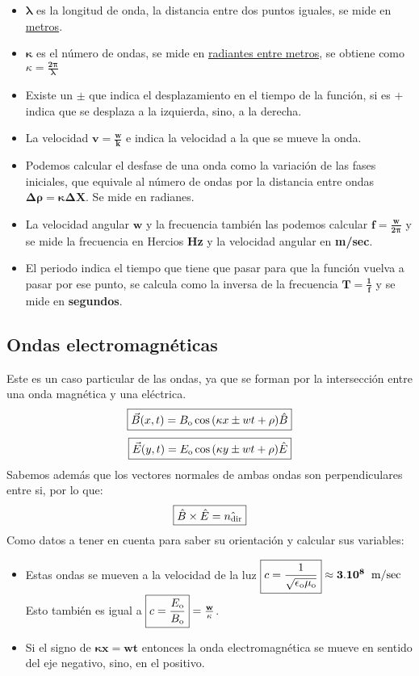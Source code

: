 \begin{itemize}
        \item \(\mathbf{\lambda}\) es la longitud de onda, la distancia entre dos puntos iguales, se mide en \underline{metros}.
        \item \(\mathbf{\kappa}\) es el número de ondas, se mide en \underline{radiantes entre metros}, se obtiene como \(\boxed{\kappa=\mathbf{\frac{2\pi}{\lambda}}}\)
        \item Existe un \(\mathbf{\pm}\) que indica el desplazamiento en el tiempo de la función, si es \(\mathbf{+}\) indica que se desplaza a la izquierda, sino, a la derecha.
        \item La velocidad \(\boxed{\mathbf{v = \frac{w}{k}}}\) e indica la velocidad a la que se mueve la onda.
        \item Podemos calcular el desfase de una onda como la variación de las fases iniciales, que equivale al número de ondas por la distancia entre ondas \(\boxed{\mathbf{\Delta \rho = \kappa \Delta X}}\). Se mide en radianes.
        \item La velocidad angular \(\mathbf{w}\) y la frecuencia también las podemos calcular \(\boxed{\mathbf{f = \frac{w}{2\pi}}}\) y se mide la frecuencia en Hercios \textbf{Hz} y la velocidad angular en \textbf{m/sec}.
        \item El periodo indica el tiempo que tiene que pasar para que la función vuelva a pasar por ese punto, se calcula como la inversa de la frecuencia \(\boxed{\mathbf{T = \frac{1}{f}}}\) y se mide en \textbf{segundos}.
\end{itemize}
\subsection{Ondas electromagnéticas}
\noindent Este es un caso particular de las ondas, ya que se forman por la intersección entre una onda magnética y una eléctrica.
\[
        \boxed{\vec{B}(x,t) = B_{\textnormal{o}} \cos{(\kappa x \pm  wt+\rho)} \hat{B}}
\]\[
        \boxed{\vec{E}(y,t) = E_{\textnormal{o}} \cos{(\kappa y \pm  wt+\rho)} \hat{E}}
\]
\noindent Sabemos además que los vectores normales de ambas ondas son perpendiculares entre si, por lo que:
\[
        \mathbf{\boxed{\hat{B} \times \hat{E} = \hat{n_{\textnormal{dir}}}}}
\]
\noindent Como datos a tener en cuenta para saber su orientación y calcular sus variables:
\begin{itemize}
        \item Estas ondas se mueven a la velocidad de la luz \(\mathbf{\boxed{c = \frac{1}{\sqrt{\epsilon_{\textnormal{o}}\mu_{\textnormal{o}}}}}\approx 3.10^8\hspace{2mm}\textnormal{m/sec}}\) Esto también es igual a \(\mathbf{\boxed{c=\frac{E_{\textnormal{o}}}{B_{\textnormal{o}}}} = \frac{w}{\kappa}}\).
        \item Si el signo de \(\boxed{\mathbf{ \kappa x } = \mathbf{wt}}\) entonces la onda electromagnética se mueve en sentido del eje negativo, sino, en el positivo.
\end{itemize}